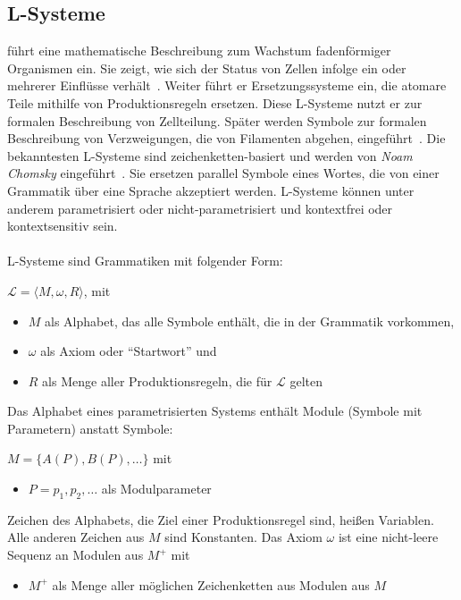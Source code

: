 \subsection*{L-Systeme}
\citeauthor{lindemayer_1968} führt eine mathematische Beschreibung zum Wachstum fadenförmiger Organismen ein.
Sie zeigt, wie sich der Status von Zellen infolge ein oder mehrerer Einflüsse verhält~\cite{lindemayer_1968}.
Weiter führt er Ersetzungssysteme ein, die atomare Teile mithilfe von Produktionsregeln ersetzen.
Diese L-Systeme nutzt er zur formalen Beschreibung von Zellteilung.
Später werden Symbole zur formalen Beschreibung von Verzweigungen, die von Filamenten abgehen, eingeführt~\cite{prusinkiewicz_1990}.
Die bekanntesten L-Systeme sind zeichenketten-basiert und werden von \textit{Noam Chomsky} eingeführt~\cite{chomsky_1956}.
Sie ersetzen parallel Symbole eines Wortes, die von einer Grammatik über eine Sprache akzeptiert werden.
L-Systeme können unter anderem parametrisiert oder nicht-parametrisiert und kontextfrei oder kontextsensitiv sein.\\~\\
L-Systeme sind Grammatiken mit folgender Form:
\begin{center}
    $\mathcal{L}=\langle M,\omega,R \rangle$, mit
    \begin{itemize}
        \item $M$ als Alphabet, das alle Symbole enthält, die in der Grammatik vorkommen,
        \item $\omega$ als Axiom oder "`Startwort"' und
        \item $R$ als Menge aller Produktionsregeln, die für $\mathcal{L}$ gelten
    \end{itemize}
\end{center}
Das Alphabet eines parametrisierten Systems enthält Module (Symbole mit Parametern) anstatt Symbole:
\begin{center}
    $M=\{A(P),B(P),\dots\}$ mit
    \begin{itemize}
        \item $P=p_1,p_2,\dots$ als Modulparameter
    \end{itemize}
\end{center}
Zeichen des Alphabets, die Ziel einer Produktionsregel sind, heißen Variablen.
Alle anderen Zeichen aus $M$ sind Konstanten.
Das Axiom $\omega$ ist eine nicht-leere Sequenz an Modulen aus $M^+$ mit
\begin{itemize}
    \item $M^+$ als Menge aller möglichen Zeichenketten aus Modulen aus $M$
\end{itemize}
